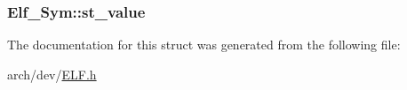 \hypertarget{struct_elf___sym_ac015122a113328a5ebe6a8336143814e}{
\subsubsection[{st\+\_\+value}]{ Elf\+\_\+\+Sym\+::st\+\_\+value}}\label{struct_elf___sym_ac015122a113328a5ebe6a8336143814e}


The documentation for this struct was generated from the following file\+:\begin{DoxyCompactItemize}
\item 
arch/dev/\hyperlink{_e_l_f_8h}{E\+L\+F.\+h}\end{DoxyCompactItemize}

